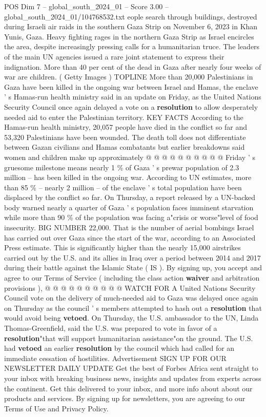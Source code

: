 \begin{textsample}{POS Dim 7 – global\_south\_2024\_01 – Score 3.00 – global\_south\_2024\_01/104768532.txt}  \label{ex:f7_pos_042}
eople search through buildings, destroyed during Israeli air raids in the southern Gaza Strip on November 6, 2023 in Khan Yunis, Gaza.
Heavy fighting rages in the northern Gaza Strip as Israel encircles the area, despite increasingly pressing calls for a humanitarian truce.
The leaders of the main UN agencies issued a rare joint statement to express their indignation.
More than 40 per cent of the dead in Gaza after nearly four weeks of war are children. ( Getty Images ) TOPLINE More than 20,000 Palestinians in Gaza have been killed in the ongoing war between Israel and Hamas, the enclave ' s Hamas-run health ministry said in an update on Friday, as the United Nations Security Council once again delayed a vote on a \textbf{resolution} to allow desperately needed aid to enter the Palestinian territory.
KEY FACTS According to the Hamas-run health ministry, 20,057 people have died in the conflict so far and 53,320 Palestinians have been wounded.
The death toll does not differentiate between Gazan civilians and Hamas combatants but earlier breakdowns said women and children make up approximately @ @ @ @ @ @ @ @ @ @ Friday ' s gruesome milestone means nearly 1 \% of Gaza ' s prewar population of 2.3 million -- has been killed in the ongoing war.
According to UN estimates, more than 85 \% -- nearly 2 million -- of the enclave ' s total population have been displaced by the conflict so far.
On Thursday, a report released by a UN-backed body warned nearly a quarter of Gaza ' s population faces imminent starvation while more than 90 \% of the population was facing a"crisis or worse"level of food insecurity.
BIG NUMBER 22,000.
That is the number of aerial bombings Israel has carried out over Gaza since the start of the war, according to an Associated Press estimate.
This is significantly higher than the nearly 15,000 airstrikes carried out by the U.S. and its allies in Iraq over a period between 2014 and 2017 during their battle against the Islamic State ( IS ).
By signing up, you accept and agree to our Terms of Service ( including the class action \textbf{waiver} and arbitration provisions ), @ @ @ @ @ @ @ @ @ @ WATCH FOR A United Nations Security Council vote on the delivery of much-needed aid to Gaza was delayed once again on Thursday as the council ' s members attempted to hash out a \textbf{resolution} that would avoid being \textbf{vetoed}.
On Thursday, the U.S. ambassador to the UN, Linda Thomas-Greenfield, said the U.S. was prepared to vote in favor of a \textbf{resolution}"that will support humanitarian assistance"on the ground.
The U.S. had \textbf{vetoed} an earlier \textbf{resolution} by the council which had called for an immediate cessation of hostilities.
Advertisement SIGN UP FOR OUR NEWSLETTER DAILY UPDATE Get the best of Forbes Africa sent straight to your inbox with breaking business news, insights and updates from experts across the continent.
Get this delivered to your inbox, and more info about about our products and services.
By signing up for newsletters, you are agreeing to our Terms of Use and Privacy Policy.

\end{textsample}

